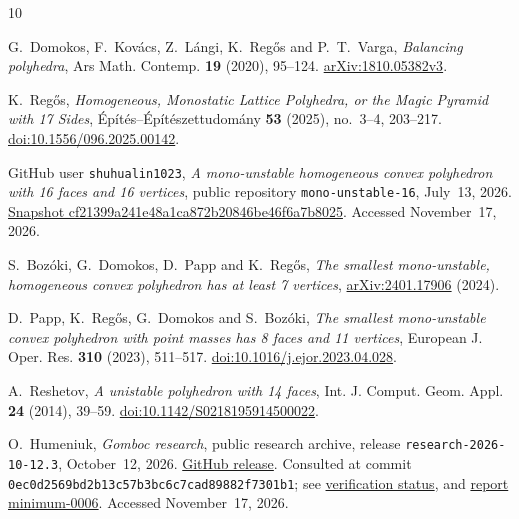 \documentclass[11pt]{amsart}
\theoremstyle{remark}
\begin{document}
\begin{thebibliography}{10}

G.~Domokos, F.~Kov\'acs, Z.~L\'angi, K.~Reg\H{o}s and P.~T.~Varga,
\emph{Balancing polyhedra},
Ars Math. Contemp. \textbf{19} (2020), 95--124.
\href{https://arxiv.org/abs/1810.05382v3}{arXiv:1810.05382v3}.

K.~Reg\H{o}s, \emph{Homogeneous, Monostatic Lattice Polyhedra, or the Magic Pyramid with 17 Sides},
\'Ep\'it\'es--\'Ep\'it\'eszettudom\'any \textbf{53} (2025), no.~3--4, 203--217.
\href{https://doi.org/10.1556/096.2025.00142}{doi:10.1556/096.2025.00142}.

GitHub user \texttt{shuhualin1023},
\emph{A mono-unstable homogeneous convex polyhedron with 16 faces and 16 vertices},
public repository \texttt{mono-unstable-16}, July~13, 2026.
\href{https://github.com/shuhualin1023/mono-unstable-16/tree/cf21399a241e48a1ca872b20846be46f6a7b8025}{Snapshot cf21399a241e48a1ca872b20846be46f6a7b8025}.
Accessed November~17, 2026.

S.~Boz\'oki, G.~Domokos, D.~Papp and K.~Reg\H{o}s,
\emph{The smallest mono-unstable, homogeneous convex polyhedron has at least 7 vertices},
\href{https://arxiv.org/abs/2401.17906}{arXiv:2401.17906} (2024).

D.~Papp, K.~Reg\H{o}s, G.~Domokos and S.~Boz\'oki,
\emph{The smallest mono-unstable convex polyhedron with point masses has 8 faces and 11 vertices},
European J. Oper. Res. \textbf{310} (2023), 511--517.
\href{https://doi.org/10.1016/j.ejor.2023.04.028}{doi:10.1016/j.ejor.2023.04.028}.

A.~Reshetov, \emph{A unistable polyhedron with 14 faces},
Int. J. Comput. Geom. Appl. \textbf{24} (2014), 39--59.
\href{https://doi.org/10.1142/S0218195914500022}{doi:10.1142/S0218195914500022}.

O.~Humeniuk, \emph{Gomboc research},
public research archive, release \texttt{research-2026-10-12.3}, October~12, 2026.
\href{https://github.com/ohresearchresults/gomboc-research/releases/tag/research-2026-10-12.3}{GitHub release}.
Consulted at commit \texttt{0ec0d2569bd2b13c57b3bc6c7cad89882f7301b1};
see \href{https://github.com/ohresearchresults/gomboc-research/blob/0ec0d2569bd2b13c57b3bc6c7cad89882f7301b1/catalog/coverage.md}{verification status}, and
\href{https://github.com/ohresearchresults/gomboc-research/blob/0ec0d2569bd2b13c57b3bc6c7cad89882f7301b1/reports/minimum/minimum-0006.md}{report minimum-0006}.
Accessed November~17, 2026.

\end{thebibliography}
\end{document}
